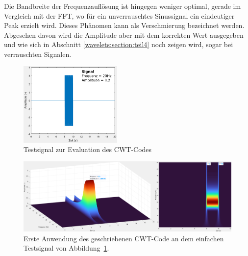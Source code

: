 Die Bandbreite der Frequenzauflösung ist hingegen weniger optimal,
gerade im Vergleich mit der FFT, wo für ein unverrauschtes Sinussignal
ein eindeutiger Peak erzielt wird.
Dieses Phänomen kann als Verschmierung bezeichnet werden.
Abgesehen davon wird die Amplitude aber mit dem korrekten Wert
ausgegeben und wie sich in Abschnitt \ref{wavelets:section:teil4}
noch zeigen wird, sogar bei verrauschten Signalen.

\begin{figure}
	\centering
	\includegraphics[width=0.45\textwidth]{papers/wavelets/images/8_BC_Signal.png}
	\caption{Testsignal zur Evaluation des CWT-Codes
	\label{wavelet:fig:ErsteAnwendung:testsignal}}
\end{figure}

\begin{figure}
	\centering
	\includegraphics[width=\textwidth]{papers/wavelets/images/12-2_CWT-1Prog.png}
	\caption{Erste Anwendung des geschriebenen CWT-Code an dem
	einfachen Testsignal von
	Abbildung~\ref{wavelet:fig:ErsteAnwendung:testsignal}.}
	\label{wavelet:fig:ErsteAnwendung}
\end{figure}

